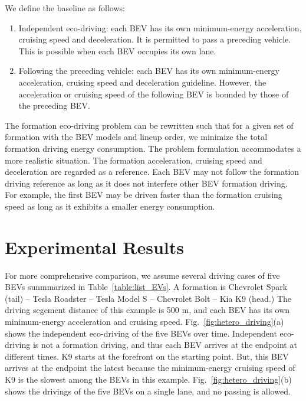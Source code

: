 \documentclass{IEEEtran}
\begin{document}
We define the baseline as follows:
\begin{enumerate}
\item Independent eco-driving: each BEV has its own minimum-energy acceleration, cruising speed and deceleration. 
It is permitted to pass a preceding vehicle. This is possible when each BEV occupies its own lane.
\item Following the preceding vehicle: each BEV has its own minimum-energy acceleration, cruising speed and deceleration guideline. However, the acceleration or cruising speed of the following BEV is bounded by those of the preceding BEV.
\end{enumerate}

The formation eco-driving problem can be rewritten such that for a given set of formation with the BEV models and lineup order, we minimize the total formation driving energy consumption.
The problem formulation accommodates a more realistic situation. The formation acceleration, cruising speed and deceleration are regarded as a reference. Each BEV may not follow the formation driving reference as long as it does not interfere other BEV formation driving. For example, the first BEV may be driven faster than the formation cruising speed as long as it exhibits a smaller energy consumption.

\section{Experimental Results}\label{sec:exp}



For more comprehensive comparison, we assume several driving cases of five BEVs sunmmarized in Table~\ref{table:list_EVs}. A formation is Chevrolet Spark (tail) -- Tesla Roadster -- Tesla Model S -- Chevrolet Bolt -- Kia K9 (head.)
The driving segement distance of this example is 500 m, and each BEV has its own minimum-energy acceleration and cruising speed. 
Fig.~\ref{fig:hetero_driving}(a) shows the independent eco-driving of the five BEVs over time. Independent eco-driving is not a formation driving, and thus each BEV arrives at the endpoint at different times.
K9 starts at the forefront on the starting point. But, this BEV arrives at the endpoint the latest because the minimum-energy cruising speed of K9 is the slowest among the BEVs in this example. 
Fig.~\ref{fig:hetero_driving}(b) shows the drivings of the five BEVs on a single lane, and no passing is allowed. 
\end{document}

